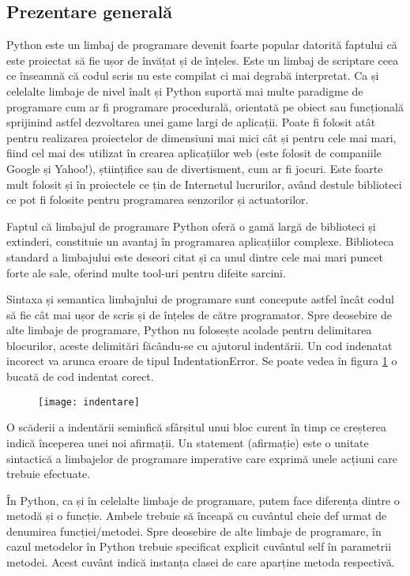 \documentclass[../IoMusT.tex]{subfiles}
\begin{document}
\subsection{Prezentare generală}
Python este un limbaj de programare devenit foarte popular datorită faptului că este proiectat să fie ușor de învățat și de înțeles. Este un limbaj de scriptare ceea ce înseamnă că codul scris nu este compilat ci mai degrabă interpretat. Ca și celelalte limbaje de nivel înalt și Python suportă mai multe paradigme de programare cum ar fi programare procedurală, orientată pe obiect sau funcțională sprijinind astfel dezvoltarea unei game largi de aplicații. Poate fi folosit atât pentru realizarea proiectelor de dimensiuni mai mici cât și pentru cele mai mari, fiind cel mai des utilizat în crearea aplicațiilor web (este folosit de companiile Google și Yahoo!), științifice sau de divertisment, cum ar fi jocuri. Este foarte mult folosit și în proiectele ce țin de Internetul lucrurilor, având destule biblioteci ce pot fi folosite pentru programarea senzorilor și actuatorilor.
\\
\par Faptul că limbajul de programare Python oferă o gamă largă de biblioteci și extinderi, constituie un avantaj în programarea aplicațiilor complexe. Biblioteca standard a limbajului este deseori citat și ca unul dintre cele mai mari puncet forte ale sale, oferind multe tool-uri pentru difeite sarcini.
\\
\par Sintaxa și semantica limbajului de programare sunt concepute astfel încât codul să fie cât mai ușor de scris și de înțeles de către programator. Spre deosebire de alte limbaje de programare, Python nu folosește acolade pentru delimitarea blocurilor, aceste delimitări făcându-se cu ajutorul indentării. Un cod indenatat incorect va arunca eroare de tipul IndentationError. Se poate vedea în figura \ref{fig:indent} o bucată de cod indentat corect.
\begin{figure}[h]
\centering
\texttt{[image: indentare]}
\caption{}
\label{fig:indent}
\end{figure}
O scăderii  a indentării  seminfică sfârșitul unui bloc curent în timp ce creșterea indică începerea unei noi afirmații. Un statement (afirmație) este o unitate sintactică a limbajelor de programare imperative care exprimă  unele acțiuni care trebuie efectuate.
\\
\par În Python, ca și în celelalte limbaje de programare, putem face diferența dintre o metodă și o funcție. Ambele trebuie să înceapă cu cuvântul cheie def urmat de denumirea funcției/metodei. Spre deosebire de alte limbaje de programare, în cazul metodelor în Python trebuie specificat explicit cuvântul self în parametrii metodei. Acest cuvânt indică instanța clasei de care aparține metoda respectivă.
\end{document}
